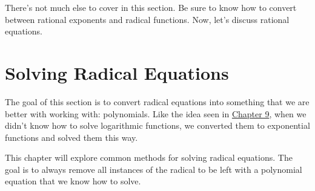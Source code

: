\documentclass[lang=en,11pt]{elegantbook}
\begin{document}
There's not much else to cover in this section.  Be sure to know how to convert between rational exponents and radical functions.  Now, let's discuss rational equations.
\section{Solving Radical Equations}
\noindent The goal of this section is to convert radical equations into something that we are better with working with: polynomials.  Like the idea seen in \hyperlink{chapter.9}{Chapter 9}, when we didn't know how to solve logarithmic functions, we converted them to exponential functions and solved them this way.

This chapter will explore common methods for solving radical equations.  The goal is to always remove all instances of the radical to be left with a polynomial equation that we know how to solve.
\end{document}
